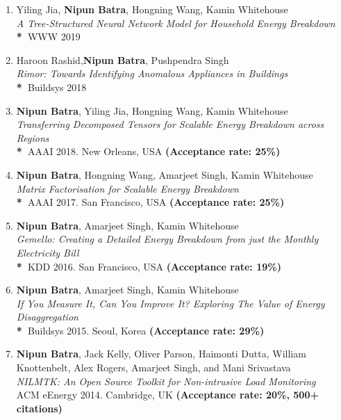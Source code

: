 \documentclass[letter,10pt]{article}
\begin{document}
\begin{itemize}
\begin{enumerate}
     
     \item
            {Yiling Jia, \textbf{Nipun Batra}, Hongning Wang, Kamin Whitehouse}\\
         	\textit{A Tree-Structured Neural Network Model for Household Energy Breakdown
}\\
	       \textbf{*~}{WWW 2019}
            \item
            {Haroon Rashid,\textbf{Nipun Batra}, Pushpendra Singh}\\
         	\textit{Rimor: Towards Identifying Anomalous Appliances in Buildings}\\
	       \textbf{*~}{Buildsys 2018}
        \item
            {\textbf{Nipun Batra}, Yiling Jia, Hongning Wang, Kamin Whitehouse}\\
         	\textit{Transferring Decomposed Tensors for Scalable Energy Breakdown across Regions}\\
	       \textbf{*~}{AAAI 2018. New Orleans, USA \textbf{(Acceptance rate: 25\%)}}
	   \item 
	   	{\textbf{Nipun Batra}, Hongning Wang, Amarjeet Singh, Kamin Whitehouse} \\\textit{Matrix Factorisation for Scalable Energy Breakdown}\\
	 \textbf{*~}{AAAI 2017. San Francisco, USA \textbf{(Acceptance rate: 25\%)}}

        \item 
        {\textbf{Nipun Batra},  Amarjeet Singh, Kamin Whitehouse}\\
 \textit{Gemello: Creating a Detailed Energy Breakdown from just the Monthly Electricity Bill}\\
        	 \textbf{*~}{KDD 2016. San Francisco, USA \textbf{(Acceptance rate: 19\%)}}
        	
        \item 
        	{\textbf{Nipun Batra},  Amarjeet Singh, Kamin Whitehouse}\\
        	\textit{If You Measure It, Can You Improve It? Exploring The Value of Energy Disaggregation}\\
    	 \textbf{*~}{Buildsys 2015. Seoul, Korea \textbf{(Acceptance rate: 29\%)}}
	\item 
			{\textbf{Nipun Batra}, Jack Kelly, Oliver Parson, Haimonti Dutta, William Knottenbelt, Alex Rogers, Amarjeet Singh, and Mani Srivastava}\\
        \textit{NILMTK: An Open Source Toolkit for Non-intrusive Load Monitoring}\\
		{ACM eEnergy 2014. Cambridge, UK \textbf{(Acceptance rate: 20\%, 500+ citations)}}
		

\end{enumerate}
\end{itemize}
\end{document}
